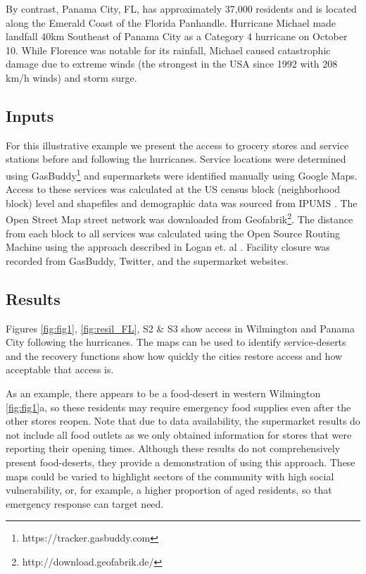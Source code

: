 \documentclass[9pt,twocolumn,twoside,lineno]{pnas-new}
\begin{document}
By contrast, Panama City, FL, has approximately 37,000 residents and is located along the Emerald Coast of the Florida Panhandle. 
Hurricane Michael made landfall 40km Southeast of Panama City as a Category 4 hurricane on October 10. 
While Florence was notable for its rainfall, Michael caused catastrophic damage due to extreme winds (the strongest in the USA since 1992 with 208 km/h winds) and storm surge. 

\subsection*{Inputs}
For this illustrative example we present the access to grocery stores and service stations before and following the hurricanes. 
Service locations were determined using GasBuddy\footnote{https://tracker.gasbuddy.com} and supermarkets were identified manually using Google Maps.
Access to these services was calculated at the US census block (neighborhood block) level and shapefiles and demographic data was sourced from IPUMS \cite{Manson2018-ug}. 
The Open Street Map street network was downloaded from Geofabrik\footnote{http://download.geofabrik.de/}. 
The distance from each block to all services was calculated using the Open Source Routing Machine using the approach described in Logan et. al \cite{Logan2017-fr}. 
Facility closure was recorded from GasBuddy, Twitter, and the supermarket websites.

\subsection*{Results}
Figures \ref{fig:fig1}, \ref{fig:resil_FL}, S2 \& S3 show access in Wilmington and Panama City following the hurricanes. 
The maps can be used to identify service-deserts and the recovery functions show how quickly the cities restore access and how acceptable that access is.

As an example, there appears to be a food-desert in western Wilmington \ref{fig:fig1}a, so these residents may require emergency food supplies even after the other stores reopen.
Note that due to data availability, the supermarket results do not include all food outlets as we only obtained information for stores that were reporting their opening times.
Although these results do not comprehensively present food-deserts, they provide a demonstration of using this approach.
These maps could be varied to highlight sectors of the community with high social vulnerability, or, for example, a higher proportion of aged residents, so that emergency response can target need.
\end{document}
